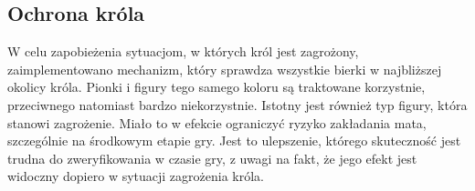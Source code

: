 \subsection{Ochrona króla}
\label{subsec:ochrona-krola}

W celu zapobieżenia sytuacjom, w których król jest zagrożony, zaimplementowano mechanizm, który sprawdza wszystkie bierki w najbliższej okolicy króla.
Pionki i figury tego samego koloru są traktowane korzystnie, przeciwnego natomiast bardzo niekorzystnie.
Istotny jest również typ figury, która stanowi zagrożenie.
Miało to w efekcie ograniczyć ryzyko zakładania mata, szczególnie na środkowym etapie gry.
Jest to ulepszenie, którego skuteczność jest trudna do zweryfikowania w czasie gry, z uwagi na fakt, że jego efekt jest widoczny dopiero w sytuacji zagrożenia króla.

